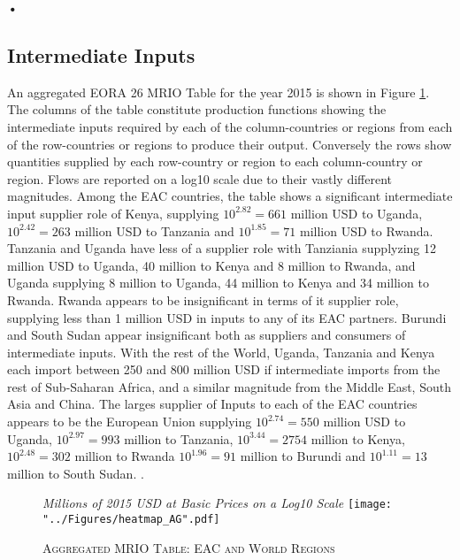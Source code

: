 \textbf{\textbf{•}}\documentclass[a4paper]{article}
\begin{document}
\subsection{Intermediate Inputs}
An aggregated EORA 26 MRIO Table for the year 2015 is shown in Figure \ref{fig:wld}.  The columns of the table constitute production functions showing the intermediate inputs required by each of the column-countries or regions from each of the row-countries or regions to produce their output. Conversely the rows show quantities supplied by each row-country or region to each column-country or region. Flows are reported on a log10 scale due to their vastly different magnitudes. Among the EAC countries, the table shows a significant intermediate input supplier role of Kenya, supplying $10^{2.82} = 661$ million USD to Uganda, $10^{2.42} = 263$ million USD to Tanzania and  $10^{1.85} = 71$ million USD to Rwanda. Tanzania and Uganda have less of a supplier role with Tanziania supplyzing 12 million USD to Uganda, 40 million to Kenya and 8 million to Rwanda, and Uganda supplying 8 million to Uganda, 44 million to Kenya and 34 million to Rwanda. Rwanda appears to be insignificant in terms of it supplier role, supplying less than 1 million USD in inputs to any of its EAC partners. Burundi and South Sudan appear insignificant both as suppliers and consumers of intermediate inputs. With the rest of the World, Uganda, Tanzania and Kenya each import between 250 and 800 million USD if intermediate imports from the rest of Sub-Saharan Africa, and a similar magnitude from the Middle East, South Asia and China. The larges supplier of Inputs to each of the EAC countries appears to be the European Union supplying $10^2.74 = 550$ million USD to Uganda, $10^2.97 = 993$ million to Tanzania, $10^3.44 = 2754$ million to Kenya, $10^2.48 = 302$ million to Rwanda  $10^1.96 = 91$ million to Burundi and $10^1.11 = 13$ million to South Sudan. 
.

\begin{figure}[h!]
\centering
\caption{\label{fig:wld}\textsc{Aggregated MRIO Table: EAC and World Regions}}
\small{\textit{Millions of 2015 USD at Basic Prices on a Log10 Scale}}
\texttt{[image: "../Figures/heatmap\_AG".pdf]} %
\end{figure}
\FloatBarrier
\end{document}
